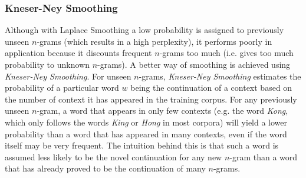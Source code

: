 \subsubsection{Kneser-Ney Smoothing}

Although with Laplace Smoothing a low probability is assigned to previously unseen $n$-grams (which results in a high perplexity), it performs poorly in application because it discounts frequent $n$-grams too much (i.e. gives too much probability to unknown $n$-grams). A better way of smoothing is achieved using \textit{Kneser-Ney Smoothing}. For unseen $n$-grams, \textit{Kneser-Ney Smoothing} estimates the probability of a particular word $w$ being the continuation of a context based on the number of context it has appeared in the training corpus. For any previously unseen $n$-gram, a word that appears in only few contexts (e.g. the word \textit{Kong}, which only follows the words \textit{King} or \textit{Hong} in most corpora) will yield a lower probability than a word that has appeared in many contexts, even if the word itself may be very frequent. The intuition behind this is that such a word is assumed less likely to be the novel continuation for any new $n$-gram than a word that has already proved to be the continuation of many $n$-grams.